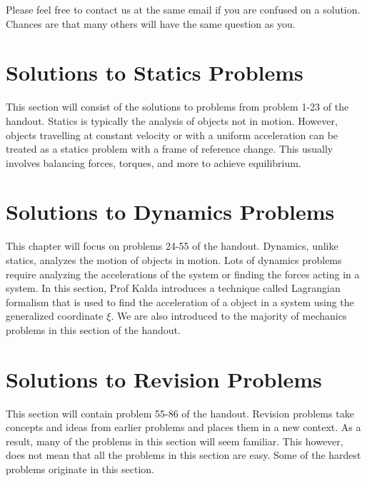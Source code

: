 \documentclass[11pt]{article}
\begin{document}
Please feel free to contact us at the same email if you are confused on a solution. Chances are that many others will have the same question as you.

\newpage
\section{Solutions to Statics Problems}
\vspace{-5mm}
This section will consist of the solutions to problems from problem 1-23 of the handout. Statics is typically the analysis of objects not in motion. However, objects travelling at constant velocity or with a uniform acceleration can be treated as a statics problem with a frame of reference change. This usually involves balancing forces, torques, and more to achieve equilibrium. 

























\newpage
\section{Solutions to Dynamics Problems}

This chapter will focus on problems 24-55 of the handout. Dynamics, unlike statics, analyzes the motion of objects in motion. Lots of dynamics problems require analyzing the accelerations of the system or finding the forces acting in a system. In this section, Prof Kalda introduces a technique called Lagrangian formalism that is used to find the acceleration of a object in a system using the generalized coordinate $\xi$. We are also introduced to the majority of mechanics problems in this section of the handout.


































\newpage
\section{Solutions to Revision Problems}
This section will contain problem 55-86 of the handout. Revision problems take concepts and ideas from earlier problems and places them in a new context. As a result, many of the problems in this section will seem familiar. This however, does not mean that all the problems in this section are easy. Some of the hardest problems originate in this section.
\end{document}
